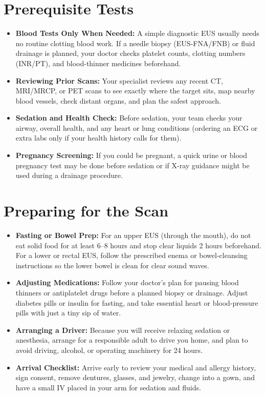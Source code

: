 \section{Prerequisite Tests}

\begin{itemize}
    \item \textbf{Blood Tests Only When Needed:} A simple diagnostic EUS usually needs no routine clotting blood work. If a needle biopsy (EUS-FNA/FNB) or fluid drainage is planned, your doctor checks platelet counts, clotting numbers (INR/PT), and blood-thinner medicines beforehand.
    \item \textbf{Reviewing Prior Scans:} Your specialist reviews any recent CT, MRI/MRCP, or PET scans to see exactly where the target sits, map nearby blood vessels, check distant organs, and plan the safest approach.
    \item \textbf{Sedation and Health Check:} Before sedation, your team checks your airway, overall health, and any heart or lung conditions (ordering an ECG or extra labs only if your health history calls for them).
    \item \textbf{Pregnancy Screening:} If you could be pregnant, a quick urine or blood pregnancy test may be done before sedation or if X-ray guidance might be used during a drainage procedure.
\end{itemize}

\section{Preparing for the Scan}

\begin{itemize}
    \item \textbf{Fasting or Bowel Prep:} For an upper EUS (through the mouth), do not eat solid food for at least 6--8 hours and stop clear liquids 2 hours beforehand. For a lower or rectal EUS, follow the prescribed enema or bowel-cleansing instructions so the lower bowel is clean for clear sound waves.
    \item \textbf{Adjusting Medications:} Follow your doctor's plan for pausing blood thinners or antiplatelet drugs before a planned biopsy or drainage. Adjust diabetes pills or insulin for fasting, and take essential heart or blood-pressure pills with just a tiny sip of water.
    \item \textbf{Arranging a Driver:} Because you will receive relaxing sedation or anesthesia, arrange for a responsible adult to drive you home, and plan to avoid driving, alcohol, or operating machinery for 24 hours.
    \item \textbf{Arrival Checklist:} Arrive early to review your medical and allergy history, sign consent, remove dentures, glasses, and jewelry, change into a gown, and have a small IV placed in your arm for sedation and fluids.
\end{itemize}

